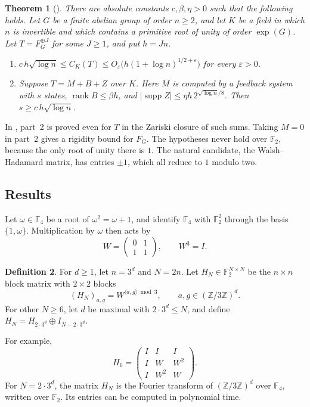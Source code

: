\documentclass[11pt]{article}
\newtheorem{theorem}{Theorem}[section]
\theoremstyle{definition}
\newtheorem{definition}[theorem]{Definition}
\theoremstyle{remark}
\newcommand{\F}{\mathbb{F}}
\newcommand{\Z}{\mathbb{Z}}
\newcommand{\supp}{\operatorname{supp}}
\newcommand{\rk}{\operatorname{rank}}
\begin{document}
\begin{theorem}[{\cite[Theorems~1.1 and~1.2]{FFT}}]\label{thm:fft}
There are absolute constants $c,\beta,\eta>0$ such that the following
holds. Let $G$ be a finite abelian group of order $n\ge2$, and let $K$ be
a field in which $n$ is invertible and which contains a primitive root of
unity of order $\exp(G)$. Let $T=F_G^{\oplus J}$ for some $J\ge1$, and put
$h=Jn$.
\begin{enumerate}
\item $c\,h\sqrt{\log n}\le C_K(T)\le O_\varepsilon\bigl(h(1+\log n)^{1/2+\varepsilon}\bigr)$
for every $\varepsilon>0$.
\item Suppose $T=M+B+Z$ over $K$. Here $M$ is computed by a feedback
system with $s$ states, $\rk B\le\beta h$, and
$|\supp Z|\le\eta h\,2^{\sqrt{\log n}/8}$. Then $s\ge c\,h\sqrt{\log n}$.
\end{enumerate}
\end{theorem}

In \cite{FFT}, part~2 is proved even for $T$ in the Zariski closure of
such sums. Taking $M=0$ in part~2 gives a rigidity bound for $F_G$. The
hypotheses never hold over $\F_2$, because the only root of unity there is
$1$. The natural candidate, the Walsh--Hadamard matrix, has entries
$\pm1$, which all reduce to $1$ modulo two.

\subsection{Results}
Let $\omega\in\F_4$ be a root of $\omega^2=\omega+1$, and identify $\F_4$
with $\F_2^2$ through the basis $\{1,\omega\}$. Multiplication by $\omega$
then acts by
\[
W=\begin{pmatrix}0&1\\1&1\end{pmatrix},\qquad W^3=I.
\]

\begin{definition}\label{def:H}
For $d\ge1$, let $n=3^d$ and $N=2n$. Let $H_N\in\F_2^{N\times N}$ be the
$n\times n$ block matrix with $2\times2$ blocks
\[
(H_N)_{a,g}=W^{\langle a,g\rangle\bmod3},\qquad a,g\in(\Z/3\Z)^d.
\]
For other $N\ge6$, let $d$ be maximal with $2\cdot3^d\le N$, and define
$H_N=H_{2\cdot3^d}\oplus I_{N-2\cdot3^d}$.
\end{definition}

For example,
\[
H_6=\begin{pmatrix}I&I&I\\I&W&W^2\\I&W^2&W\end{pmatrix}.
\]
For $N=2\cdot3^d$, the matrix $H_N$ is the Fourier transform of
$(\Z/3\Z)^d$ over $\F_4$, written over $\F_2$. Its entries can be computed
in polynomial time.
\end{document}
